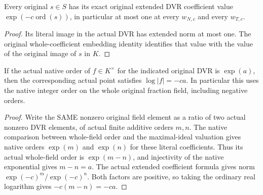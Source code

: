\begin{lemma}
\label{lem:gauss-surface-scaled-field-points-bounded}
\leanok
\leavevmode\par
Every original $s\in S$ has its exact original extended DVR coefficient
value $\exp(-c\operatorname{ord}(s))$, in particular at most one at every $w_{N,c}$ and
every $w_{T,c}$.
\end{lemma}
\begin{proof}
Its literal image in the actual DVR has extended norm at most one.
The original whole-coefficient embedding identity identifies that value
with the value of the original image of $s$ in $K$.
\end{proof}

\begin{lemma}
\label{lem:gauss-surface-native-order-real-log}
\leanok
\leavevmode\par
If the actual native order of $f\in K^\times$ for the indicated original
DVR is $\exp(a)$, then the corresponding actual point satisfies
$\log|f|=-ca$. In particular this uses the native integer order on the
whole original fraction field, including negative orders.
\end{lemma}
\begin{proof}
Write the SAME nonzero original field element as a ratio of two actual
nonzero DVR elements, of actual finite additive orders $m,n$. The native
comparison between whole-field order and the maximal-ideal valuation gives
native orders $\exp(m)$ and $\exp(n)$ for these literal coefficients.
Thus its actual whole-field order is $\exp(m-n)$, and injectivity of the
native exponential gives $m-n=a$. The actual extended coefficient formula
gives norm $\exp(-c)^m/\exp(-c)^n$. Both factors are positive, so taking
the ordinary real logarithm gives $-c(m-n)=-ca$.
\end{proof}

